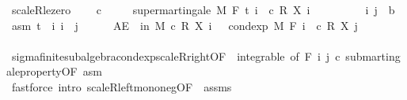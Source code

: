 \begin{isabellebody}
%
\isadelimproof
\isanewline
%
\endisadelimproof
\isanewline
{}\isamarkupfalse%
\ scaleR{\isacharunderscore}{\kern0pt}le{\isacharunderscore}{\kern0pt}zero{\isacharcolon}{\kern0pt}\ \isanewline
\ \ \ {\isachardoublequoteopen}c\ {\isasymle}\ {}{\isachardoublequoteclose}\isanewline
\ \ \ {\isachardoublequoteopen}supermartingale\ M\ F\ t\ {\isacharparenleft}{\kern0pt}{\isasymlambda}i\ {\isasymxi}{\isachardot}{\kern0pt}\ c\ {\isacharasterisk}{\kern0pt}\isactrlsub R\ X\ i\ {\isasymxi}{\isacharparenright}{\kern0pt}{\isachardoublequoteclose}\isanewline
%
\isadelimproof
%
\endisadelimproof
%
\isatagproof
{}\isamarkupfalse%
\isanewline
\ \ \isacommand{{\isacharbraceleft}{\kern0pt}}\isamarkupfalse%
\isanewline
\ \ \ \ \isamarkupfalse%
\ i\ j\ {\isacharcolon}{\kern0pt}{\isacharcolon}{\kern0pt}\ {\isacharprime}{\kern0pt}b\ \isamarkupfalse%
\ asm{\isacharcolon}{\kern0pt}\ {\isachardoublequoteopen}t\ {\isasymle}\ i{\isachardoublequoteclose}\ {\isachardoublequoteopen}i\ {\isasymle}\ j{\isachardoublequoteclose}\isanewline
\ \ \ \ \isamarkupfalse%
\ {\isachardoublequoteopen}AE\ {\isasymxi}\ in\ M{\isachardot}{\kern0pt}\ c\ {\isacharasterisk}{\kern0pt}\isactrlsub R\ X\ i\ {\isasymxi}\ {\isasymge}\ cond{\isacharunderscore}{\kern0pt}exp\ M\ {\isacharparenleft}{\kern0pt}F\ i{\isacharparenright}{\kern0pt}\ {\isacharparenleft}{\kern0pt}{\isasymlambda}{\isasymxi}{\isachardot}{\kern0pt}\ c\ {\isacharasterisk}{\kern0pt}\isactrlsub R\ X\ j\ {\isasymxi}{\isacharparenright}{\kern0pt}\ {\isasymxi}{\isachardoublequoteclose}\ \isanewline
\ \ \ \ \ \ \isamarkupfalse%
\ sigma{\isacharunderscore}{\kern0pt}finite{\isacharunderscore}{\kern0pt}subalgebra{\isachardot}{\kern0pt}cond{\isacharunderscore}{\kern0pt}exp{\isacharunderscore}{\kern0pt}scaleR{\isacharunderscore}{\kern0pt}right{\isacharbrackleft}{\kern0pt}OF\ {\isacharunderscore}{\kern0pt}\ integrable{\isacharcomma}{\kern0pt}\ of\ {\isachardoublequoteopen}F\ i{\isachardoublequoteclose}\ j\ c{\isacharbrackright}{\kern0pt}\ submartingale{\isacharunderscore}{\kern0pt}property{\isacharbrackleft}{\kern0pt}OF\ asm{\isacharbrackright}{\kern0pt}\ \isanewline
\ \ \ \ \ \ \ \ \ \ \ \ \isamarkupfalse%
\ {\isacharparenleft}{\kern0pt}fastforce\ intro{\isacharbang}{\kern0pt}{\isacharcolon}{\kern0pt}\ scaleR{\isacharunderscore}{\kern0pt}left{\isacharunderscore}{\kern0pt}mono{\isacharunderscore}{\kern0pt}neg{\isacharbrackleft}{\kern0pt}OF\ {\isacharunderscore}{\kern0pt}\ assms{\isacharbrackright}{\kern0pt}{\isacharparenright}{\kern0pt}\isanewline

\end{isabellebody}
